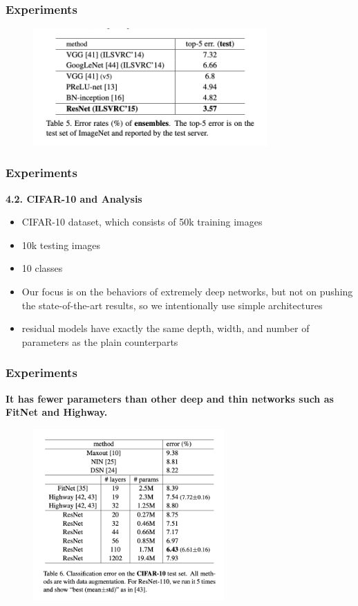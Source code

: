 \documentclass[
	11pt, %
]{beamer}
\begin{document}
\begin{frame}
	\frametitle{Experiments}

	\begin{figure}
		\centering
		\includegraphics[width=0.8\textwidth]{./images/Screenshot 2025-05-20 at 0.34.30.png}
	\end{figure}
\end{frame}

\begin{frame}
	\frametitle{Experiments}

	\textbf{4.2. CIFAR-10 and Analysis}

	\begin{itemize}
		\item CIFAR-10 dataset, which consists of 50k training images
		\item 10k testing images
		\item 10 classes
		\item Our focus is on the behaviors of extremely deep networks, but not on pushing the state-of-the-art results, so we intentionally use simple architectures
		\item residual models have exactly the same depth, width, and number of parameters as the plain counterparts
	\end{itemize}
\end{frame}

\begin{frame}
	\frametitle{Experiments}

	\textbf{It has fewer parameters than other deep and thin networks such as FitNet and Highway. }

	\begin{figure}
		\centering
		\includegraphics[width=0.65\textwidth]{./images/Screenshot 2025-05-20 at 0.40.29.png}
	\end{figure}
\end{frame}
\end{document}
